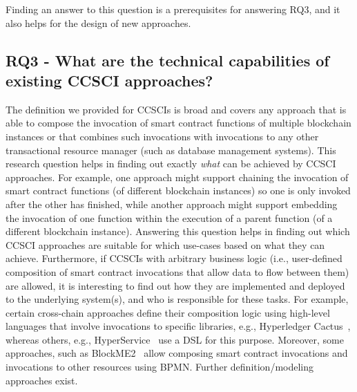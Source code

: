 \documentclass[review]{elsarticle}
\begin{document}
Finding an answer to this question is a prerequisites for answering RQ3, and it also helps for the design of new approaches.

\subsection*{RQ3 - What are the technical capabilities of existing CCSCI approaches?}
The definition we provided for CCSCIs is broad and covers any approach that is able to compose the invocation of smart contract functions of multiple blockchain instances or that combines such invocations with invocations to any other transactional resource manager (such as database management systems).
This research question helps in finding out exactly \textit{what} can be achieved by CCSCI approaches.
For example, one approach might support chaining the invocation of smart contract functions (of different blockchain instances) so one is only invoked after the other has finished, while another approach might support embedding the invocation of one function within the execution of a parent function (of a different blockchain instance).
Answering this question helps in finding out which CCSCI approaches are suitable for which use-cases based on what they can achieve.
Furthermore, if CCSCIs with arbitrary business logic (i.e., user-defined composition of smart contract invocations that allow data to flow between them) are allowed, it is interesting to find out how they are implemented and deployed to the underlying system(s), and who is responsible for these tasks.
For example, certain cross-chain approaches define their composition logic using high-level languages that involve invocations to specific libraries, e.g., Hyperledger Cactus~\cite{Montgomery2020Cactus}, whereas others, e.g., HyperService~\cite{Liu2019Hyperservice} use a DSL for this purpose.
Moreover, some approaches, such as BlockME2~\cite{Falazi2019_SmartContractComposition} allow composing smart contract invocations and invocations to other resources using BPMN.
Further definition/modeling approaches exist.
 
\end{document}
